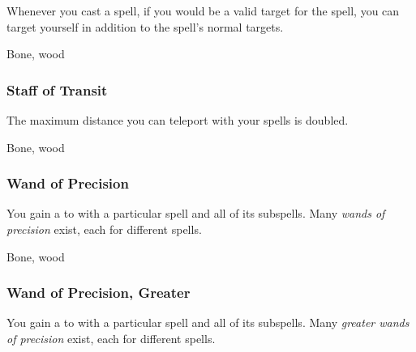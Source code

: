 Whenever you cast a   spell, if you would be a valid target for the spell, you can target yourself in addition to the spell's normal targets.



 


 Bone, wood


\lowercase{\hypertarget{item:Staff of Transit}{}}\label{item:Staff of Transit}
\hypertarget{item:Staff of Transit}{\subsubsection{Staff of Transit\hfill{}}}

The maximum distance you can teleport with your  spells is doubled.



 


 Bone, wood


\lowercase{\hypertarget{item:Wand of Precision}{}}\label{item:Wand of Precision}
\hypertarget{item:Wand of Precision}{\subsubsection{Wand of Precision\hfill{}}}

You gain a   to  with a particular spell and all of its subspells.
Many \textit{wands of precision} exist, each for different spells.



 


 Bone, wood


\lowercase{\hypertarget{item:Wand of Precision, Greater}{}}\label{item:Wand of Precision, Greater}
\hypertarget{item:Wand of Precision, Greater}{\subsubsection{Wand of Precision, Greater\hfill{}}}

You gain a   to  with a particular spell and all of its subspells.
Many \textit{greater wands of precision} exist, each for different spells.



 


